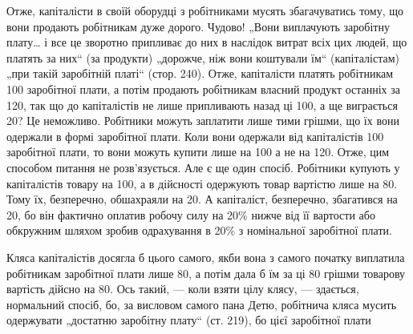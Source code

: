 Отже, капіталісти в своїй оборудці з робітниками мусять збагачуватись
тому, що вони продають робітникам дуже дорого. Чудово! „Вони
виплачують заробітну плату\dots{} і все це зворотно припливає до них в наслідок
витрат всіх цих людей, що платять за них“ (за продукти) „дорожче,
ніж вони коштували їм“ (капіталістам) „при такій заробітній
платі“ (стор. 240). Отже, капіталісти платять робітникам 100 заробітної плати, а потім продають робітникам власний продукт
останніх за 120, так що до капіталістів не лише припливають
назад ці 100, а ще виграється 20? Це неможливо.
Робітники можуть заплатити лише тими грішми, що їх вони одержали
в формі заробітної плати. Коли вони одержали від капіталістів 100 заробітної плати, то вони можуть купити лише на 100
а не на 120. Отже, цим способом питання не розв’язується. Але
є ще один спосіб. Робітники купують у капіталістів товару на 100, а в дійсності одержують товар вартістю лише на 80.
Тому їх, безперечно, обшахраяли на 20. А капіталіст, безперечно,
збагатився на 20, бо він фактично оплатив робочу силу
на 20\% нижче від її вартости або обкружним шляхом зробив одрахування
в 20\% з номінальної заробітної плати.

Кляса капіталістів досягла б цього самого, якби вона з самого початку
виплатила робітникам заробітної плати лише 80, а потім
дала б їм за ці 80 грішми товарову вартість дійсно на 80. Ось такий, — коли взяти цілу клясу, — здається, нормальний спосіб,
бо, за висловом самого пана Детю, робітнича кляса мусить одержувати
„достатню заробітну плату“ (ст. 219), бо цієї заробітної плати
\parbreak{}  %
